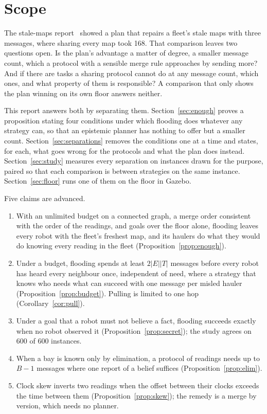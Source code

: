 \documentclass[11pt,a4paper]{article}
\theoremstyle{definition}
\begin{document}
\tableofcontents
\newpage

\section{Scope}
\label{sec:scope}

The stale-maps report~\cite{ulises2026sm} showed a plan that repairs a fleet's
stale maps with three messages, where sharing every map took 168. That comparison
leaves two questions open. Is the plan's advantage a matter of degree, a smaller
message count, which a protocol with a sensible merge rule approaches by sending
more? And if there are tasks a sharing protocol cannot do at any message count,
which ones, and what property of them is responsible? A comparison that only
shows the plan winning on its own floor answers neither.

This report answers both by separating them. Section~\ref{sec:enough} proves a
proposition stating four conditions under which flooding does whatever any
strategy can, so that an epistemic planner has nothing to offer but a smaller
count. Section~\ref{sec:separations} removes the conditions one at a time and
states, for each, what goes wrong for the protocols and what the plan does
instead. Section~\ref{sec:study} measures every separation on instances drawn
for the purpose, paired so that each comparison is between strategies on the same
instance. Section~\ref{sec:floor} runs one of them on the floor in Gazebo.

Five claims are advanced.

\begin{enumerate}[leftmargin=1.4em, itemsep=2pt]
  \item With an unlimited budget on a connected graph, a merge order consistent
        with the order of the readings, and goals over the floor alone, flooding
        leaves every robot with the fleet's freshest map, and its haulers do what
        they would do knowing every reading in the fleet
        (Proposition~\ref{prop:enough}).
  \item Under a budget, flooding spends at least $2|E||T|$ messages before every
        robot has heard every neighbour once, independent of need, where a
        strategy that knows who needs what can succeed with one message per
        misled hauler (Proposition~\ref{prop:budget}). Pulling is limited to
        one hop (Corollary~\ref{cor:pull}).
  \item Under a goal that a robot must not believe a fact, flooding succeeds
        exactly when no robot observed it (Proposition~\ref{prop:secret}); the
        study agrees on 600 of 600 instances.
  \item When a bay is known only by elimination, a protocol of readings needs up
        to $B-1$ messages where one report of a belief suffices
        (Proposition~\ref{prop:elim}).
  \item Clock skew inverts two readings when the offset between their clocks
        exceeds the time between them (Proposition~\ref{prop:skew}); the
        remedy is a merge by version, which needs no planner.
\end{enumerate}
\end{document}
